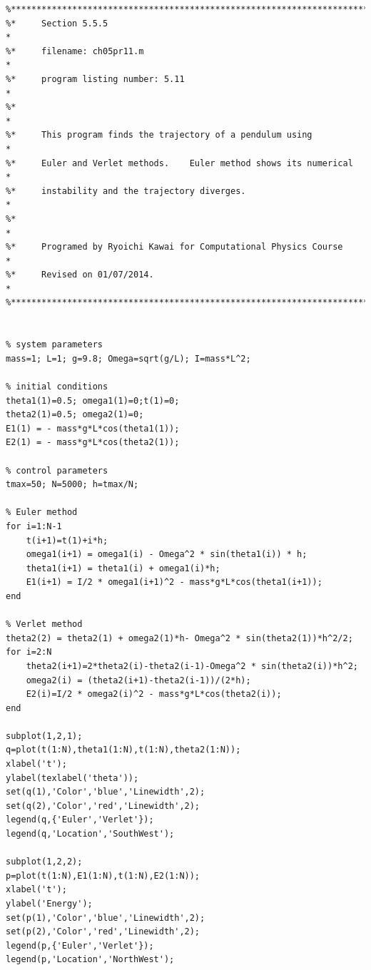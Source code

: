 \footnotesize
\begin{verbatim}
%**************************************************************************
%*     Section 5.5.5                                                      *
%*     filename: ch05pr11.m                                               *
%*     program listing number: 5.11                                       *
%*                                                                        *
%*     This program finds the trajectory of a pendulum using              *
%*     Euler and Verlet methods.    Euler method shows its numerical      *
%*     instability and the trajectory diverges.                           *
%*                                                                        *
%*     Programed by Ryoichi Kawai for Computational Physics Course        *
%*     Revised on 01/07/2014.                                             *
%**************************************************************************


% system parameters
mass=1; L=1; g=9.8; Omega=sqrt(g/L); I=mass*L^2;

% initial conditions
theta1(1)=0.5; omega1(1)=0;t(1)=0;
theta2(1)=0.5; omega2(1)=0;
E1(1) = - mass*g*L*cos(theta1(1));
E2(1) = - mass*g*L*cos(theta2(1));

% control parameters
tmax=50; N=5000; h=tmax/N;

% Euler method
for i=1:N-1
    t(i+1)=t(1)+i*h;
    omega1(i+1) = omega1(i) - Omega^2 * sin(theta1(i)) * h;
    theta1(i+1) = theta1(i) + omega1(i)*h;
    E1(i+1) = I/2 * omega1(i+1)^2 - mass*g*L*cos(theta1(i+1));
end

% Verlet method
theta2(2) = theta2(1) + omega2(1)*h- Omega^2 * sin(theta2(1))*h^2/2;
for i=2:N
    theta2(i+1)=2*theta2(i)-theta2(i-1)-Omega^2 * sin(theta2(i))*h^2;
    omega2(i) = (theta2(i+1)-theta2(i-1))/(2*h);
    E2(i)=I/2 * omega2(i)^2 - mass*g*L*cos(theta2(i));
end

subplot(1,2,1);
q=plot(t(1:N),theta1(1:N),t(1:N),theta2(1:N));
xlabel('t');
ylabel(texlabel('theta'));
set(q(1),'Color','blue','Linewidth',2);
set(q(2),'Color','red','Linewidth',2);
legend(q,{'Euler','Verlet'});
legend(q,'Location','SouthWest');

subplot(1,2,2);
p=plot(t(1:N),E1(1:N),t(1:N),E2(1:N));
xlabel('t');
ylabel('Energy');
set(p(1),'Color','blue','Linewidth',2);
set(p(2),'Color','red','Linewidth',2);
legend(p,{'Euler','Verlet'});
legend(p,'Location','NorthWest');
\end{verbatim}
\normalsize


